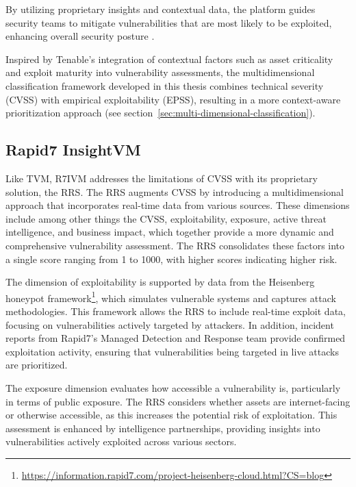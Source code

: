 By utilizing proprietary insights and contextual data, the platform guides security teams to mitigate vulnerabilities that are most likely to be exploited, enhancing overall security posture \autocite{tenable_inc_tenable_2024}. 

Inspired by Tenable's integration of contextual factors such as asset criticality and exploit maturity into vulnerability assessments, the multidimensional classification framework developed in this thesis combines technical severity (\ac{CVSS}) with empirical exploitability (\ac{EPSS}), resulting in a more context-aware prioritization approach (see section~\ref{sec:multi-dimensional-classification}).

\subsection{Rapid7 InsightVM}
\label{subsec:rapid7-insightvm}

Like \ac{TVM}, \ac{R7IVM} addresses the limitations of \ac{CVSS} with its proprietary solution, the \ac{RRS}. The \ac{RRS} augments \ac{CVSS} by introducing a multidimensional approach that incorporates real-time data from various sources. These dimensions include among other things the \ac{CVSS}, exploitability, exposure, active threat intelligence, and business impact, which together provide a more dynamic and comprehensive vulnerability assessment. The \ac{RRS} consolidates these factors into a single score ranging from 1 to 1000, with higher scores indicating higher risk.

The dimension of exploitability is supported by data from the Heisenberg honeypot framework\footnote{\url{https://information.rapid7.com/project-heisenberg-cloud.html?CS=blog}}, which simulates vulnerable systems and captures attack methodologies. This framework allows the \ac{RRS} to include real-time exploit data, focusing on vulnerabilities actively targeted by attackers. In addition, incident reports from Rapid7's Managed Detection and Response team provide confirmed exploitation activity, ensuring that vulnerabilities being targeted in live attacks are prioritized.

The exposure dimension evaluates how accessible a vulnerability is, particularly in terms of public exposure. The \ac{RRS} considers whether assets are internet-facing or otherwise accessible, as this increases the potential risk of exploitation. This assessment is enhanced by intelligence partnerships, providing insights into vulnerabilities actively exploited across various sectors.

